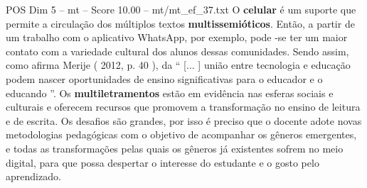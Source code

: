 \begin{textsample}{POS Dim 5 – mt – Score 10.00 – mt/mt\_ef\_37.txt}
O \textbf{celular} é um suporte que permite a circulação dos múltiplos textos \textbf{multissemióticos}.
Então, a partir de um trabalho com o aplicativo WhatsApp, por exemplo, pode -se ter um maior contato com a variedade cultural dos alunos dessas comunidades.
Sendo assim, como afirma Merije ( 2012, p. 40 ), da “ [... ] união entre tecnologia e educação podem nascer oportunidades de ensino significativas para o educador e o educando ”.
Os \textbf{multiletramentos} estão em evidência nas esferas sociais e culturais e oferecem recursos que promovem a transformação no ensino de leitura e de escrita.
Os desafios são grandes, por isso é preciso que o docente adote novas metodologias pedagógicas com o objetivo de acompanhar os gêneros emergentes, e todas as transformações pelas quais os gêneros já existentes sofrem no meio digital, para que possa despertar o interesse do estudante e o gosto pelo aprendizado.

\end{textsample}
